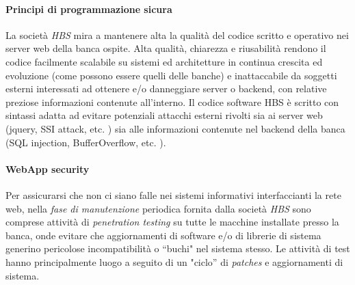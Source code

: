 


\paragraph{Principi di programmazione sicura}

La società \emph{HBS} mira a mantenere alta la qualità del codice scritto e operativo nei server web della banca ospite. Alta qualità, chiarezza e riusabilità rendono il codice facilmente scalabile su sistemi ed architetture in continua crescita ed evoluzione (come possono essere quelli delle banche) e inattaccabile da soggetti esterni interessati ad ottenere e/o danneggiare server o backend, con relative preziose informazioni contenute all'interno.
Il codice software HBS è scritto con sintassi adatta ad evitare potenziali attacchi esterni rivolti sia ai server web (jquery, SSI attack, etc. ) sia alle informazioni contenute nel backend della banca (SQL injection, BufferOverflow, etc. ).

\paragraph{WebApp security}
Per assicurarsi che non ci siano falle nei sistemi informativi interfaccianti la rete web, nella \emph{fase di manutenzione} periodica fornita dalla società \emph{HBS} sono comprese attività di \emph{penetration testing} su tutte le macchine installate presso la banca, onde evitare che aggiornamenti di software e/o di librerie di sistema generino pericolose incompatibilità o ``buchi" nel sistema stesso. Le attività di test hanno principalmente luogo a seguito di un "ciclo'' di \emph{patches} e aggiornamenti di sistema.





